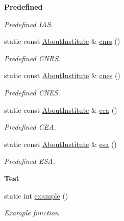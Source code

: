 \begin{Indent}{\bf Predefined}
\begin{DoxyCompactItemize}
\begin{DoxyCompactList}\small\item\em Predefined I\-A\-S. \end{DoxyCompactList}\item 
static const \hyperlink{exceptionmagrathea_1_1AboutInstitute}{About\-Institute} \& \hyperlink{exceptionmagrathea_1_1AboutInstitute_a6efdaa07f32775c1417fed95e2504b0b}{cnrs} ()
\begin{DoxyCompactList}\small\item\em Predefined C\-N\-R\-S. \end{DoxyCompactList}\item 
static const \hyperlink{exceptionmagrathea_1_1AboutInstitute}{About\-Institute} \& \hyperlink{exceptionmagrathea_1_1AboutInstitute_a5d7cca86e81c21955f38877786ba22e6}{cnes} ()
\begin{DoxyCompactList}\small\item\em Predefined C\-N\-E\-S. \end{DoxyCompactList}\item 
static const \hyperlink{exceptionmagrathea_1_1AboutInstitute}{About\-Institute} \& \hyperlink{exceptionmagrathea_1_1AboutInstitute_a12057d474dbfd6c5304aabcf8bc6a08a}{cea} ()
\begin{DoxyCompactList}\small\item\em Predefined C\-E\-A. \end{DoxyCompactList}\item 
static const \hyperlink{exceptionmagrathea_1_1AboutInstitute}{About\-Institute} \& \hyperlink{exceptionmagrathea_1_1AboutInstitute_a2c3ea3c6b555a468a03a02cc2f99e24b}{esa} ()
\begin{DoxyCompactList}\small\item\em Predefined E\-S\-A. \end{DoxyCompactList}\end{DoxyCompactItemize}
\end{Indent}
\begin{Indent}{\bf Test}\par
\begin{DoxyCompactItemize}
\item 
static int \hyperlink{exceptionmagrathea_1_1AboutInstitute_a872fff44c4ce51caa8b9ba99369c7bbb}{example} ()
\begin{DoxyCompactList}\small\item\em Example function. \end{DoxyCompactList}\end{DoxyCompactItemize}
\end{Indent}
